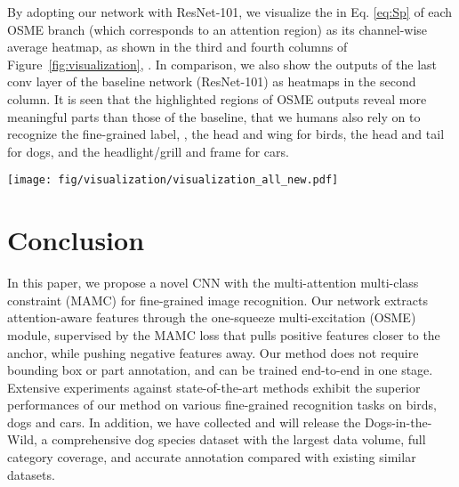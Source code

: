 \documentclass[runningheads]{llncs}
\begin{document}
By adopting our network with ResNet-101, we visualize the  in Eq. \ref{eq:Sp} of each OSME branch (which corresponds to an attention region) as its channel-wise average heatmap, as shown in the third and fourth columns of Figure~\ref{fig:visualization}, .
In comparison, we also show the outputs of the last conv layer of the baseline network (ResNet-101) as heatmaps in the second column.
It is seen that the highlighted regions of OSME outputs reveal more meaningful parts than those of the baseline, that we humans also rely on to recognize the fine-grained label, \eg, the head and wing for birds, the head and tail for dogs, and the headlight/grill and frame for cars.

\begin{figure*}[t]
	\centering
	\texttt{[image: fig/visualization/visualization\_all\_new.pdf]}
	\caption{Visualization of the attention regions detected by the OSME. For each dataset, the first column shows the input image, the second column shows the heatmap from the last conv layer of the baseline ResNet-101; the third and fourth columns show the heatmaps of the two detected attention regions via OSME.}
	\label{fig:visualization}
        \vspace{-.1in}
\end{figure*}

\vspace{-.1in}
\section{Conclusion}
\label{conclustion}

In this paper, we propose a novel CNN with the multi-attention multi-class constraint (MAMC) for fine-grained image recognition.
Our network extracts attention-aware features through the one-squeeze multi-excitation (OSME) module, supervised by the MAMC loss that pulls positive features closer to the anchor, while pushing negative features away.
Our method does not require bounding box or part annotation, and can be trained end-to-end in one stage.
Extensive experiments against state-of-the-art methods exhibit the superior performances of our method on various fine-grained recognition tasks on birds, dogs and cars.
In addition, we have collected and will release the Dogs-in-the-Wild, a comprehensive dog species dataset with the largest data volume, full category coverage, and accurate annotation compared with existing similar datasets.





\end{document}

